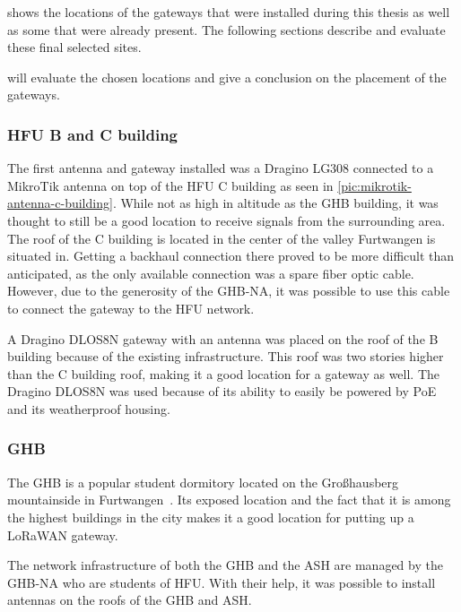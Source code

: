  shows the locations of the gateways that were installed during this thesis as well as some that were already present.
The following sections describe and evaluate these final selected sites.

 will evaluate the chosen locations and give a conclusion on the placement of the gateways.

\subsubsection{\ac{HFU} B and C building}

The first antenna and gateway installed was a Dragino LG308 connected to a MikroTik antenna on top of the \ac{HFU} C building as seen in \cref{pic:mikrotik-antenna-c-building}.
While not as high in altitude as the \ac{GHB} building, it was thought to still be a good location to receive signals from the surrounding area.
The roof of the C building is located in the center of the valley Furtwangen is situated in.
Getting a backhaul connection there proved to be more difficult than anticipated, as the only available connection was a spare fiber optic cable.
However, due to the generosity of the \acl{GHB-NA}, it was possible to use this cable to connect the gateway to the \ac{HFU} network.

A Dragino DLOS8N gateway with an antenna was placed on the roof of the B building because of the existing infrastructure.
This roof was two stories higher than the C building roof, making it a good location for a gateway as well.
The Dragino DLOS8N was used because of its ability to easily be powered by \ac{PoE} and its weatherproof housing.

\subsubsection{\acf{GHB}}

The \ac{GHB} is a popular student dormitory located on the Großhausberg mountainside in Furtwangen~\cite{ghb_netadmins_student_2023}.
Its exposed location and the fact that it is among the highest buildings in the city makes it a good location for putting up a \ac{LoRaWAN} gateway.

The network infrastructure of both the \ac{GHB} and the \ac{ASH} are managed by the \acl{GHB-NA} who are students of \ac{HFU}.
With their help, it was possible to install antennas on the roofs of the \ac{GHB} and \ac{ASH}.

